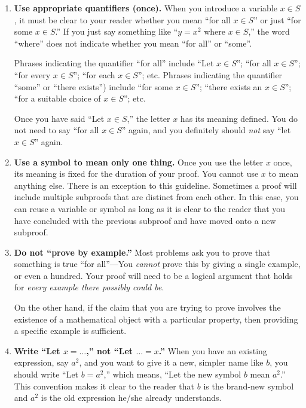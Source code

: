 \begin{enumerate}
\item \textbf{Use appropriate quantifiers (once).}
When you introduce a variable $x\in S$, it must be clear to your reader whether you mean ``for all $x\in S$'' or just ``for some $x\in S$.'' If you just say something like ``$y=x^2$ where $x\in S$,'' the word ``where'' does not indicate whether you mean ``for all'' or ``some''.
        
Phrases indicating the quantifier ``for all'' include ``Let $x\in S$''; ``for all $x\in S$''; ``for every $x\in S$''; ``for each $x\in S$''; etc. Phrases indicating the quantifier ``some'' or ``there exists'') include ``for some $x\in S$''; ``there exists an $x\in S$''; ``for a suitable choice of $x\in S$''; etc.

Once you have said ``Let $x\in S$,'' the letter $x$ has its meaning defined. You do not need to say ``for all $x\in S$'' again, and you definitely should \emph{not} say ``let $x\in S$'' again.

\item \textbf{Use a symbol to mean only one thing.}
Once you use the letter $x$ once, its meaning is fixed for the duration of your proof. You cannot use $x$ to mean anything else. There is an exception to this guideline.  Sometimes a proof will include multiple subproofs that are distinct from each other.  In this case, you can reuse a variable or symbol as long as it is clear to the reader that you have concluded with the previous subproof and have moved onto a new subproof.   

\item \textbf{Do not ``prove by example.''}\label{pfbyexample}
Most problems ask you to prove that something is true ``for all''---You \emph{cannot} prove this by giving a single example, or even a hundred. Your proof will need to be a logical argument that holds for \emph{every example there possibly could be}.

On the other hand, if the claim that you are trying to prove involves the existence of a mathematical object with a particular property, then providing a specific example is sufficient.
        
\item \textbf{Write ``Let $x=\dots$,'' not ``Let $\dots=x$.''} 
When you have an existing expression, say $a^{2}$, and you want to give it a new, simpler name like $b$, you should write ``Let $b=a^{2}$,'' which means, ``Let the new symbol $b$ mean $a^{2}$.'' This convention makes it clear to the reader that $b$ is the brand-new symbol and $a^{2}$ is the old expression he/she already understands.
        

\end{enumerate}
